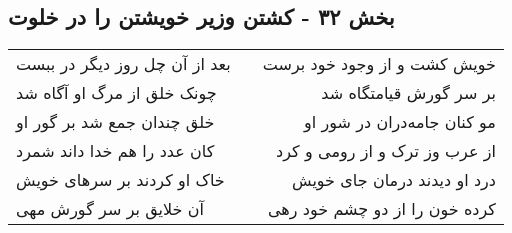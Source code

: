 \begin{center}
\section*{بخش ۳۲ - کشتن وزیر خویشتن را در خلوت}
\label{sec:sh032}
\begin{longtable}{l p{0.5cm} r}
بعد از آن چل روز دیگر در ببست
&&
خویش کشت و از وجود خود برست
\\
چونک خلق از مرگ او آگاه شد
&&
بر سر گورش قیامتگاه شد
\\
خلق چندان جمع شد بر گور او
&&
مو کنان جامه‌دران در شور او
\\
کان عدد را هم خدا داند شمرد
&&
از عرب وز ترک و از رومی و کرد
\\
خاک او کردند بر سرهای خویش
&&
درد او دیدند درمان جای خویش
\\
آن خلایق بر سر گورش مهی
&&
کرده خون را از دو چشم خود رهی
\\
\end{longtable}
\end{center}
